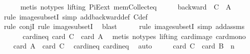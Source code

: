 \begin{isabellebody}
\ \ \ \ \isamarkupfalse%
\ {\isacharparenleft}{\kern0pt}metis\ {\isacharparenleft}{\kern0pt}no{\isacharunderscore}{\kern0pt}types{\isacharcomma}{\kern0pt}\ lifting{\isacharparenright}{\kern0pt}\ PiE{\isacharunderscore}{\kern0pt}ext\ mem{\isacharunderscore}{\kern0pt}Collect{\isacharunderscore}{\kern0pt}eq{\isacharparenright}{\kern0pt}\isanewline
\ \ \isamarkupfalse%
\ \isamarkupfalse%
\ {\isachardoublequoteopen}backward\ {\isacharbackquote}{\kern0pt}\ C\ {\isasymsubseteq}\ {\isacharquery}{\kern0pt}A{\isachardoublequoteclose}\isanewline
\ \ \ \ \isamarkupfalse%
\ {\isacharparenleft}{\kern0pt}rule\ image{\isacharunderscore}{\kern0pt}subsetI{\isacharcomma}{\kern0pt}\ simp\ add{\isacharcolon}{\kern0pt}backward{\isacharunderscore}{\kern0pt}def\ C{\isacharunderscore}{\kern0pt}def{\isacharparenright}{\kern0pt}\isanewline
\ \ \ \ \isamarkupfalse%
\ {\isacharparenleft}{\kern0pt}rule\ conjI{\isacharcomma}{\kern0pt}\ rule\ image{\isacharunderscore}{\kern0pt}subsetI{\isacharparenright}{\kern0pt}\ \isamarkupfalse%
\ blast\isanewline
\ \ \ \ \isamarkupfalse%
\ {\isacharparenleft}{\kern0pt}rule\ image{\isacharunderscore}{\kern0pt}subsetI{\isacharcomma}{\kern0pt}\ simp\ add{\isacharcolon}{\kern0pt}assms{\isacharparenright}{\kern0pt}\isanewline
\ \ \isamarkupfalse%
\ \isamarkupfalse%
\ \ card{\isacharunderscore}{\kern0pt}ineq{\isacharunderscore}{\kern0pt}{}{\isacharcolon}{\kern0pt}\ {\isachardoublequoteopen}card\ C\ {\isasymle}\ card\ {\isacharquery}{\kern0pt}A{\isachardoublequoteclose}\ \isamarkupfalse%
\ {\isacharparenleft}{\kern0pt}metis\ {\isacharparenleft}{\kern0pt}no{\isacharunderscore}{\kern0pt}types{\isacharcomma}{\kern0pt}\ lifting{\isacharparenright}{\kern0pt}\ card{\isacharunderscore}{\kern0pt}image\ card{\isacharunderscore}{\kern0pt}mono{\isacharparenright}{\kern0pt}\isanewline
\isanewline
\ \ \isamarkupfalse%
\ {\isachardoublequoteopen}card\ {\isacharquery}{\kern0pt}A\ {\isacharequal}{\kern0pt}\ card\ C{\isachardoublequoteclose}\ \isamarkupfalse%
\ card{\isacharunderscore}{\kern0pt}ineq{\isacharunderscore}{\kern0pt}{}\ card{\isacharunderscore}{\kern0pt}ineq{\isacharunderscore}{\kern0pt}{}\ \isamarkupfalse%
\ auto\isanewline
\ \ \isamarkupfalse%
\ \isamarkupfalse%
\ {\isachardoublequoteopen}card\ C\ {\isacharequal}{\kern0pt}\ card\ B\ {\isacharcircum}{\kern0pt}\ n{\isachardoublequoteclose}\ \isamarkupfalse%

\end{isabellebody}
